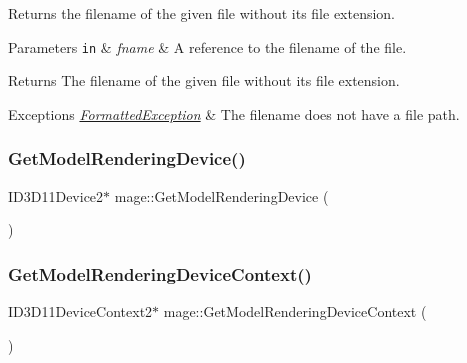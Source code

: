 Returns the filename of the given file without its file extension.


\begin{DoxyParams}[1]{Parameters}
\mbox{\tt in}  & {\em fname} & A reference to the filename of the file. \\
\hline
\end{DoxyParams}
\begin{DoxyReturn}{Returns}
The filename of the given file without its file extension. 
\end{DoxyReturn}

\begin{DoxyExceptions}{Exceptions}
{\em \hyperlink{structmage_1_1_formatted_exception}{Formatted\+Exception}} & The filename does not have a file path. \\
\hline
\end{DoxyExceptions}
\hypertarget{namespacemage_abe853bf4c3fee4be87be306f04e66ba3}{}\label{namespacemage_abe853bf4c3fee4be87be306f04e66ba3} 
\subsubsection{\texorpdfstring{Get\+Model\+Rendering\+Device()}{GetModelRenderingDevice()}}
{\footnotesize\ttfamily I\+D3\+D11\+Device2$\ast$ mage\+::\+Get\+Model\+Rendering\+Device (\begin{DoxyParamCaption}{ }\end{DoxyParamCaption})\hspace{0.3cm}{\ttfamily [noexcept]}}

\hypertarget{namespacemage_a32622fbfff97a28a659f80eb0e1e1d00}{}\label{namespacemage_a32622fbfff97a28a659f80eb0e1e1d00} 
\subsubsection{\texorpdfstring{Get\+Model\+Rendering\+Device\+Context()}{GetModelRenderingDeviceContext()}}
{\footnotesize\ttfamily I\+D3\+D11\+Device\+Context2$\ast$ mage\+::\+Get\+Model\+Rendering\+Device\+Context (\begin{DoxyParamCaption}{ }\end{DoxyParamCaption})\hspace{0.3cm}{\ttfamily [noexcept]}}

